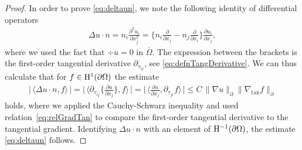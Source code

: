 \begin{proof}
  In order to prove \eqref{eq:deltaun}, we note the following identity of differential operators
  \begin{align*}
    \Delta u \cdot n = n_i \frac{\partial^2 u_i}{\partial x_j^2} = \Big\{ n_i \frac{\partial}{\partial x_j} - n_j \frac{\partial}{\partial x_i} \Big\} \frac{\partial u_i}{\partial x_j},
  \end{align*}
  where we used the fact that $\div u = 0$ in $\overline \Omega$.
  The expression between the brackets is the first-order tangential derivative $\partial_{\tau_{ij}}$, see \eqref{eq:defnTangDerivative}. 
  We can thus calculate that for $f \in \mathrm{H}^1(\partial\Omega)$ the estimate
  \begin{align*}
    \Big|\,\Big\langle \Delta u \cdot n, f \Big\rangle\, \Big|
    = \Big|\,\Big\langle \partial_{\tau_{ij}} \Big\{\frac{\partial u}{\partial x_j} \Big\}, f \Big\rangle \, \Big|
    = \Big|\,\Big\langle \frac{\partial u}{\partial x_j} ,  \partial_{\tau_{ji}} f \Big\rangle \, \Big|
    \leq C\, \|\nabla u\|^{}_\partial \|\nabla_{\mathrm{tan}} f \|^{}_\partial
  \end{align*}
  holds, where we applied the Cauchy-Schwarz inequality and used relation~\eqref{eq:relGradTan} to compare the first-order tangential derivative to the tangential gradient.
  Identifying $\Delta u \cdot n$ with an element of $\mathrm{H}^{-1}(\partial\Omega)$, the estimate \eqref{eq:deltaun} follows. 


\end{proof}
